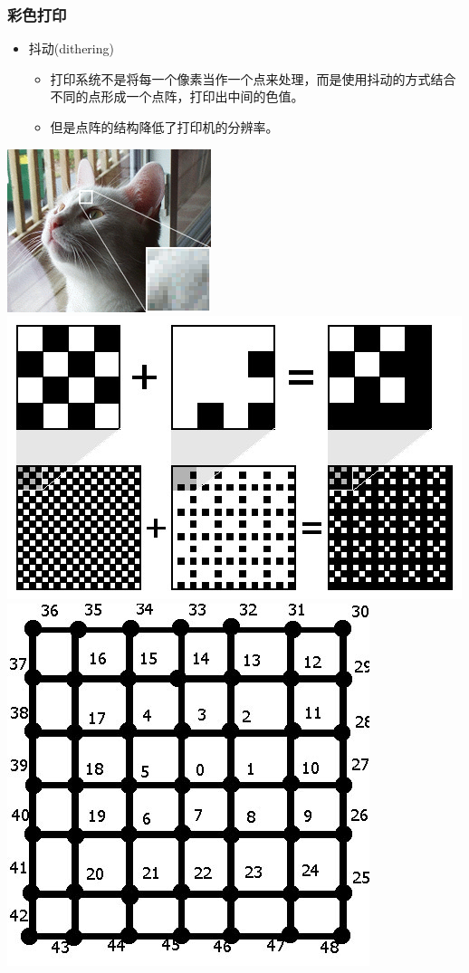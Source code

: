 \documentclass{beamer}
\begin{document}
\begin{frame}
	\frametitle{彩色打印}
	\begin{itemize}
		\item 抖动(dithering)
		\begin{itemize}
			\item 打印系统不是将每一个像素当作一个点来处理，而是使用抖动的方式结合不同的点形成一个点阵，打印出中间的色值。
			\item 但是点阵的结构降低了打印机的分辨率。
		\end{itemize}
	\end{itemize}
	\begin{center}
	\includegraphics[width=.3\textwidth]{images/225px-Dithering_example_dithered_256color.png}
	\includegraphics[width=.3\textwidth]{images/dither.jpg}
	\includegraphics[width=.4\textwidth]{images/rectangularDitheringImage.jpg}
	\end{center}
\end{frame}
\end{document}
